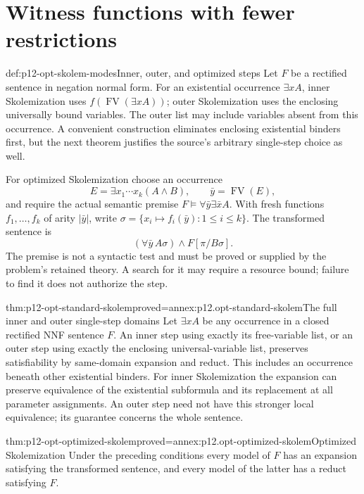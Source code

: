 \section{Witness functions with fewer restrictions}
\begin{hbdefinition}{def:p12-opt-skolem-modes}{Inner, outer, and optimized steps}
Let \(F\) be a rectified sentence in negation normal form.
For an existential occurrence \(\exists xA\), inner Skolemization
uses \(f(\operatorname{FV}(\exists xA))\); outer Skolemization uses
the enclosing universally bound variables. The outer list may
include variables absent from this occurrence. A convenient
construction eliminates enclosing existential binders first, but
the next theorem justifies the source's arbitrary single-step
choice as well.

For optimized Skolemization choose an occurrence
\[
 E=\exists x_1\cdots x_k(A\land B),\qquad
 \bar y=\operatorname{FV}(E),
\]
and require the actual semantic premise
\(F\models\forall\bar y\exists\bar x A\).
With fresh functions \(f_1,\ldots,f_k\) of arity \(|\bar y|\),
write \(\sigma=\{x_i\mapsto f_i(\bar y):1\le i\le k\}\).
The transformed sentence is
\[
  (\forall\bar y\,A\sigma)\land F[\pi/B\sigma].
\]
The premise is not a syntactic test and must be proved or supplied
by the problem's retained theory. A search for it may require a
resource bound; failure to find it does not authorize the step.
\end{hbdefinition}

\begin{hbtheorem}{thm:p12-opt-standard-skolem}{proved=annex:p12.opt-standard-skolem}{The full inner and outer single-step domains}
Let \(\exists xA\) be any occurrence in a closed rectified NNF
sentence \(F\). An inner step using exactly its free-variable list,
or an outer step using exactly the enclosing universal-variable
list, preserves satisfiability by same-domain expansion and reduct.
This includes an occurrence beneath other existential binders.
For inner Skolemization the expansion can preserve equivalence
of the existential subformula and its replacement at all parameter
assignments. An outer step need not have this stronger local
equivalence; its guarantee concerns the whole sentence.
\end{hbtheorem}

\begin{hbtheorem}{thm:p12-opt-optimized-skolem}{proved=annex:p12.opt-optimized-skolem}{Optimized Skolemization}
Under the preceding conditions every model of \(F\) has an expansion
satisfying the transformed sentence, and every model of the latter
has a reduct satisfying \(F\).
\end{hbtheorem}

